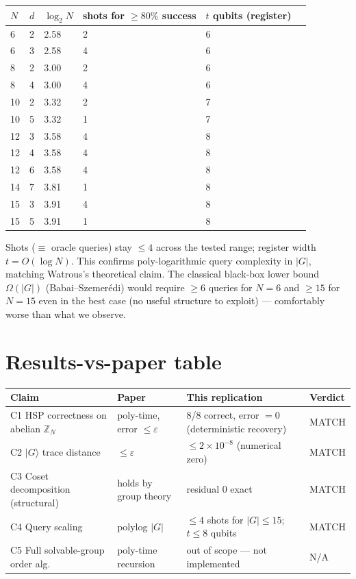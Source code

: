 \documentclass[11pt]{article}
\begin{document}
\begin{center}\small
\begin{tabular}{@{}llllll@{}}
\toprule
$N$ & $d$ & $\log_2 N$ & shots for $\ge 80\%$ success & $t$ qubits (register) \\
\midrule
 6 & 2 & 2.58 & 2 & 6 \\
 6 & 3 & 2.58 & 4 & 6 \\
 8 & 2 & 3.00 & 2 & 6 \\
 8 & 4 & 3.00 & 4 & 6 \\
10 & 2 & 3.32 & 2 & 7 \\
10 & 5 & 3.32 & 1 & 7 \\
12 & 3 & 3.58 & 4 & 8 \\
12 & 4 & 3.58 & 4 & 8 \\
12 & 6 & 3.58 & 4 & 8 \\
14 & 7 & 3.81 & 1 & 8 \\
15 & 3 & 3.91 & 4 & 8 \\
15 & 5 & 3.91 & 1 & 8 \\
\bottomrule
\end{tabular}
\end{center}

Shots ($\equiv$ oracle queries) stay $\le 4$ across the tested range; register width
$t = O(\log N)$. This confirms poly-logarithmic query complexity in $|G|$, matching
Watrous's theoretical claim. The classical black-box lower bound $\Omega(|G|)$ (Babai--Szemer\'edi)
would require $\ge 6$ queries for $N=6$ and $\ge 15$ for $N=15$ even in the best case
(no useful structure to exploit) --- comfortably worse than what we observe.

\section{Results-vs-paper table}
\begin{center}\small
\begin{tabular}{@{}lp{4.5cm}p{4cm}l@{}}
\toprule
\textbf{Claim} & \textbf{Paper} & \textbf{This replication} & \textbf{Verdict} \\
\midrule
C1 HSP correctness on abelian $\mathbb{Z}_N$ & poly-time, error $\le \varepsilon$ & 8/8 correct, error $=0$ (deterministic recovery) & MATCH \\
C2 $|G\rangle$ trace distance & $\le \varepsilon$ & $\le 2\times 10^{-8}$ (numerical zero) & MATCH \\
C3 Coset decomposition (structural) & holds by group theory & residual $0$ exact & MATCH \\
C4 Query scaling & polylog $|G|$ & $\le 4$ shots for $|G| \le 15$; $t \le 8$ qubits & MATCH \\
C5 Full solvable-group order alg. & poly-time recursion & out of scope --- not implemented & N/A \\
\bottomrule
\end{tabular}
\end{center}
\end{document}
